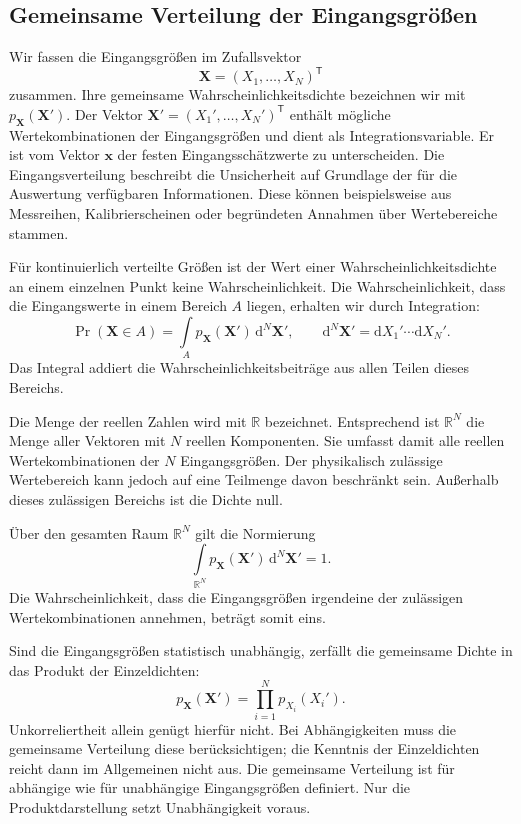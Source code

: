 \subsection{Gemeinsame Verteilung der Eingangsgrößen}

Wir fassen die Eingangsgrößen im Zufallsvektor
\begin{equation}
\mathbf X=(X_1,\dots,X_N)^\mathsf T
\end{equation}
zusammen. Ihre gemeinsame Wahrscheinlichkeitsdichte bezeichnen wir mit
$p_{\mathbf X}(\mathbf X')$.
Der Vektor $\mathbf X'=(X_1',\dots,X_N')^\mathsf T$ enthält mögliche
Wertekombinationen der Eingangsgrößen und dient als Integrationsvariable.
Er ist vom Vektor $\mathbf x$ der festen Eingangsschätzwerte zu
unterscheiden. Die Eingangsverteilung beschreibt die Unsicherheit auf
Grundlage der für die Auswertung verfügbaren Informationen.
Diese können beispielsweise aus Messreihen, Kalibrierscheinen oder
begründeten Annahmen über Wertebereiche stammen.

Für kontinuierlich verteilte Größen ist der Wert einer
Wahrscheinlichkeitsdichte an einem einzelnen Punkt keine
Wahrscheinlichkeit. Die Wahrscheinlichkeit, dass die Eingangswerte
in einem Bereich $A$ liegen, erhalten wir durch Integration:
\begin{equation}
\Pr(\mathbf X\in A)
=\int\limits_A p_{\mathbf X}(\mathbf X')\,\mathrm d^N\mathbf X',
\qquad
\mathrm d^N\mathbf X'=\mathrm dX_1'\cdots\mathrm dX_N'.
\end{equation}
Das Integral addiert die Wahrscheinlichkeitsbeiträge aus allen
Teilen dieses Bereichs.

Die Menge der reellen Zahlen wird mit $\mathbb R$ bezeichnet.
Entsprechend ist $\mathbb R^N$ die Menge aller Vektoren mit
$N$ reellen Komponenten. Sie umfasst damit alle reellen
Wertekombinationen der $N$ Eingangsgrößen.
Der physikalisch zulässige Wertebereich kann jedoch auf
eine Teilmenge davon beschränkt sein. Außerhalb dieses
zulässigen Bereichs ist die Dichte null.

Über den gesamten Raum $\mathbb R^N$ gilt die Normierung
\begin{equation}
\int\limits_{\mathbb R^N}p_{\mathbf X}(\mathbf X')\,
\mathrm d^N\mathbf X'=1.
\end{equation}
Die Wahrscheinlichkeit, dass die Eingangsgrößen irgendeine
der zulässigen Wertekombinationen annehmen, beträgt somit eins.

Sind die Eingangsgrößen statistisch unabhängig, zerfällt die
gemeinsame Dichte in das Produkt der Einzeldichten:
\begin{equation}
p_{\mathbf X}(\mathbf X')
=\prod_{i=1}^N p_{X_i}(X_i').
\label{eq:gemeinsameEingangsdichte11}
\end{equation}
Unkorreliertheit allein genügt hierfür nicht.
Bei Abhängigkeiten muss die gemeinsame Verteilung diese berücksichtigen;
die Kenntnis der Einzeldichten reicht dann im Allgemeinen nicht aus.
Die gemeinsame Verteilung ist für abhängige wie für unabhängige
Eingangsgrößen definiert. Nur die Produktdarstellung setzt
Unabhängigkeit voraus.

